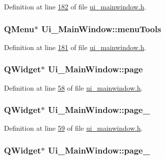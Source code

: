 Definition at line \hyperlink{a00052_source_l00182}{182} of file \hyperlink{a00052_source}{ui\+\_\+mainwindow.\+h}.

\hypertarget{a00027_a552c7b6d729252c2768c9a077679fef7}{
\subsubsection[{menu\+Tools}]{\setlength{\rightskip}{0pt plus 5cm}Q\+Menu$\ast$ Ui\+\_\+\+Main\+Window\+::menu\+Tools}}\label{a00027_a552c7b6d729252c2768c9a077679fef7}


Definition at line \hyperlink{a00052_source_l00181}{181} of file \hyperlink{a00052_source}{ui\+\_\+mainwindow.\+h}.

\hypertarget{a00027_ad7d164376bef8649ee1f94697b859417}{
\subsubsection[{page}]{\setlength{\rightskip}{0pt plus 5cm}Q\+Widget$\ast$ Ui\+\_\+\+Main\+Window\+::page}}\label{a00027_ad7d164376bef8649ee1f94697b859417}


Definition at line \hyperlink{a00052_source_l00058}{58} of file \hyperlink{a00052_source}{ui\+\_\+mainwindow.\+h}.

\hypertarget{a00027_adcb6de4cebc6760fe319711f125010cc}{
\subsubsection[{page\+\_\+2}]{\setlength{\rightskip}{0pt plus 5cm}Q\+Widget$\ast$ Ui\+\_\+\+Main\+Window\+::page\+\_}}\label{a00027_adcb6de4cebc6760fe319711f125010cc}


Definition at line \hyperlink{a00052_source_l00059}{59} of file \hyperlink{a00052_source}{ui\+\_\+mainwindow.\+h}.

\hypertarget{a00027_ac682cb2a9b686ca7c3d29771ad9ccb48}{
\subsubsection[{page\+\_\+3}]{\setlength{\rightskip}{0pt plus 5cm}Q\+Widget$\ast$ Ui\+\_\+\+Main\+Window\+::page\+\_}}\label{a00027_ac682cb2a9b686ca7c3d29771ad9ccb48}


